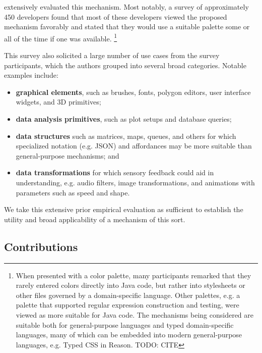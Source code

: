 \citet{Graphite} extensively evaluated this mechanism. 
Most notably, a survey of approximately 450 developers found that 
most of these developers viewed the proposed mechanism favorably and stated that they 
would use a suitable palette some or all of the time if one was available.%
\footnote{When presented with a color palette, 
many participants remarked that they rarely entered colors directly into Java code, 
but rather into stylesheets or other files governed by a domain-specific language. 
Other palettes, e.g. a palette
that supported regular expression construction and testing, were viewed as more 
suitable for Java code. 
The mechanisms being considered are suitable both for general-purpose languages
and typed domain-specific languages, many of which can be embedded into modern 
general-purpose languages, e.g. Typed CSS in Reason. TODO: CITE}

This survey also solicited a large number of use cases from the survey participants, 
which the authors grouped into several broad categories. Notable examples include:
\begin{itemize}
  \item \textbf{graphical elements}, such as brushes, fonts, polygon editors, user interface widgets, and 3D primitives;
  \item \textbf{data analysis primitives}, such as plot setups and database queries; 
  \item \textbf{data structures} such as matrices, maps, queues, and others for which specialized notation (e.g. JSON) and affordances may be more suitable than general-purpose mechanisms; and
  \item \textbf{data transformations} for which sensory feedback could aid in understanding, 
  e.g. audio filters, image transformations, and animations with parameters such as speed and shape.
\end{itemize}

We take this extensive prior empirical evaluation as sufficient to establish 
the utility and broad applicability of a mechanism of this sort. 

\subsection{Contributions}

